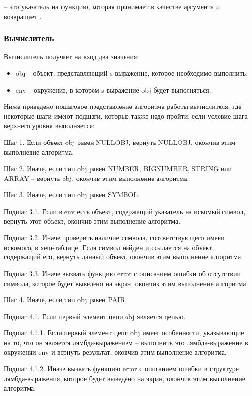  -- это указатель на функцию, которая принимает  в качестве аргумента и возвращает .

\subsubsection{Вычислитель}

Вычислитель получает на вход два значения:
\begin{itemize}
\item obj -- объект, представляющий s-выражение, которое необходимо выполнить;
\item env -- окружение, в котором s-выражение obj будет выполняться.
\end{itemize}

Ниже приведено пошаговое представление алгоритма работы вычислителя, где некоторые шаги имеют подшаги, которые также надо пройти, если условие шага верхнего уровня выполняется:

Шаг 1. Если объект obj равен NULLOBJ, вернуть NULLOBJ, окончив этим выполнение алгоритма.

Шаг 2. Иначе, если тип obj равен NUMBER, BIGNUMBER, STRING или ARRAY -- вернуть obj, окончив этим выполнение алгоритма.

Шаг 3. Иначе, если тип obj равен SYMBOL.

Подшаг 3.1. Если в env есть объект, содержащий указатель на искомый символ, вернуть этот объект, окончив этим выполнение алгоритма.

Подшаг 3.2. Иначе проверить наличие символа, соответствующего имени искомого, в хеш-таблице. Если символ найден и ссылается на объект, содержащий его, вернуть данный объект, окончив этим выполнение алгоритма.

Подшаг 3.3. Иначе вызвать функцию error с описанием ошибки об отсутствии символа, которое будет выведено на экран, окончив этим выполнение алгоритма.

Шаг 4. Иначе, если тип obj равен PAIR.

Подшаг 4.1. Если первый элемент цепи obj является цепью.

Подшаг 4.1.1. Если первый элемент цепи obj имеет особенности, указывающие на то, что он является лямбда-выражением -- выполнить это лямбда-выражение в окружении env и вернуть результат, окончив этим выполнение алгоритма.

Подшаг 4.1.2. Иначе вызвать функцию error с описанием ошибки в структуре лямбда-выражения, которое будет выведено на экран, окончив этим выполнение алгоритма.

